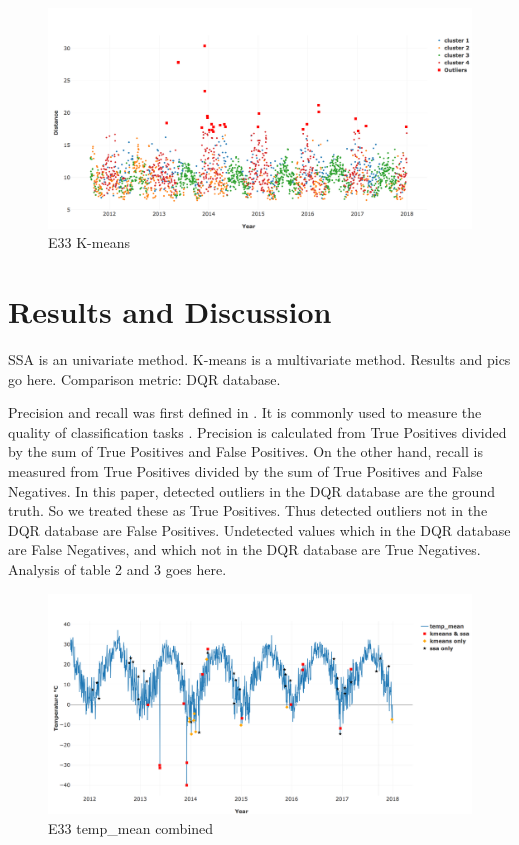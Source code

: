 \documentclass[letterpaper, 10 pt, conference]{ieeeconf}  %
\begin{document}
\begin{figure}[ht]
    \centering
    \includegraphics[width=\textwidth]{kmeans.png}
    \caption{E33 K-means}
    \label{fig:kmeans}
\end{figure}

\section{Results and Discussion}
SSA is an univariate method. K-means is a multivariate method. Results and pics go here. Comparison metric: DQR database. 

Precision and recall was first defined in \cite{perry1955machine}. It is commonly used to measure the quality of classification tasks \cite{olson2008advanced}. Precision is calculated from True Positives divided by the sum of True Positives and False Positives. On the other hand, recall is measured from True Positives divided by the sum of True Positives and False Negatives. In this paper, detected outliers in the DQR database are the ground truth. So we treated these as True Positives. Thus detected outliers not in the DQR database are False Positives. Undetected values which in the DQR database are False Negatives, and which not in the DQR database are True Negatives. Analysis of table 2 and 3 goes here.

\begin{figure}[ht]
    \centering
    \includegraphics[width=\textwidth]{combined.png}
    \caption{E33 temp\_mean combined}
    \label{fig:combined}
\end{figure}
\end{document}
